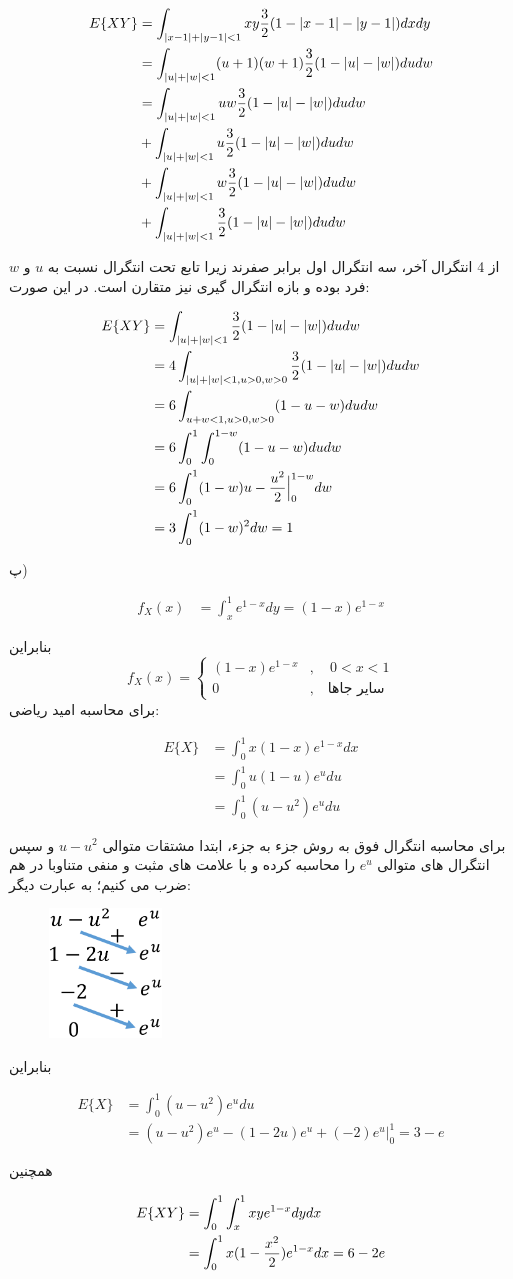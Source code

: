 \documentclass[10pt,letterpaper]{article}
\newcommand{\eqn}[1]{
\begin{equation}
\begin{split}
#1
\end{split}
\end{equation}
}
\begin{document}
\eqn{
E\{XY\}&=\int_{|x-1|+|y-1|<1} xy{3\over 2}(1-|x-1|-|y-1|)dxdy
\\&=\int_{|u|+|w|<1} (u+1)(w+1){3\over 2}(1-|u|-|w|)dudw
\\&=\int_{|u|+|w|<1} uw{3\over 2}(1-|u|-|w|)dudw
\\&+\int_{|u|+|w|<1} u{3\over 2}(1-|u|-|w|)dudw
\\&+\int_{|u|+|w|<1} w{3\over 2}(1-|u|-|w|)dudw
\\&+\int_{|u|+|w|<1} {3\over 2}(1-|u|-|w|)dudw
}
از 4 انتگرال آخر، سه انتگرال اول برابر صفرند زیرا تابع تحت انتگرال نسبت به $u$ و $w$ فرد بوده و بازه انتگرال گیری نیز متقارن است. در این صورت:
\eqn{
E\{XY\}&=\int_{|u|+|w|<1} {3\over 2}(1-|u|-|w|)dudw
\\&=4\int_{|u|+|w|<1,u>0,w>0} {3\over 2}(1-|u|-|w|)dudw
\\&=6\int_{u+w<1,u>0,w>0} (1-u-w)dudw
\\&=6\int_0^1\int_0^{1-w} (1-u-w)dudw
\\&=6\int_0^1 (1-w)u-{u^2\over 2}\Big|_0^{1-w}dw
\\&=3\int_0^1 (1-w)^2dw=1
}

پ)
\eqn{
f_X(x)&=\int_x^1e^{1-x}dy=(1-x)e^{1-x}
}
بنابراین
$$
f_{X}(x)=\begin{cases}
(1-x)e^{1-x}&,\quad 0<x<1\\
0&,\quad \text{سایر جاها}
\end{cases}
$$
برای محاسبه امید ریاضی:
\eqn{
E\{X\}&=\int_0^1 x(1-x)e^{1-x}dx
\\&=\int_0^1 u(1-u)e^{u}du
\\&=\int_0^1 (u-u^2)e^{u}du
}
برای محاسبه انتگرال فوق به روش جزء به جزء، ابتدا مشتقات متوالی $u-u^2$ و سپس انتگرال های متوالی $e^u$ را محاسبه کرده و با علامت های مثبت و منفی متناوبا در هم ضرب می کنیم؛ به عبارت دیگر:
\begin{figure}[htbp]
\centering
\includegraphics[width=30mm]{ibp_hw11.png}
\end{figure}
بنابراین
\eqn{
E\{X\}&=\int_0^1 (u-u^2)e^{u}du
\\&=(u-u^2)e^{u}-(1-2u)e^{u}+(-2)e^u\Big|_0^1=3-e
}
همچنین
\eqn{
E\{XY\}&=\int_0^1\int_x^1 xye^{1-x}dydx
\\&=\int_0^1 x(1-{x^2\over 2})e^{1-x}dx=6-2e
}
\end{document}
